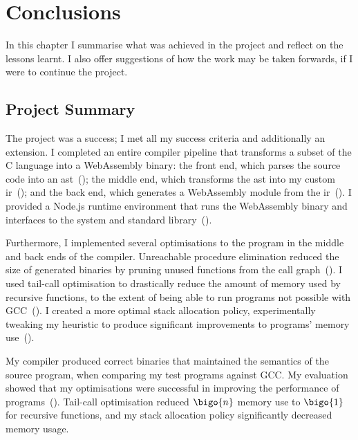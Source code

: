 \documentclass[00-main.tex]{subfiles}
\begin{document}
\chapter{Conclusions}

In this chapter I summarise what was achieved in the project and reflect on the lessons learnt.
I also offer suggestions of how the work may be taken forwards, if I were to continue the project.

\section{Project Summary}

The project was a success; I met all my success criteria and additionally an extension.
I completed an entire compiler pipeline that transforms a subset of the C language into a WebAssembly binary: the front end, which parses the source code into an \gls{ast}~(); the middle end, which transforms the \gls{ast} into my custom \gls{ir}~(); and the back end, which generates a WebAssembly module from the \gls{ir}~().
I provided a Node.js runtime environment that runs the WebAssembly binary and interfaces to the system and standard library~().

Furthermore, I implemented several optimisations to the program in the middle and back ends of the compiler.
Unreachable procedure elimination reduced the size of generated binaries by pruning unused functions from the call graph~().
I used tail-call optimisation to drastically reduce the amount of memory used by recursive functions, to the extent of being able to run programs not possible with GCC~().
I created a more optimal stack allocation policy, experimentally tweaking my heuristic to produce significant improvements to programs' memory use~().

My compiler produced correct binaries that maintained the semantics of the source program, when comparing my test programs against GCC\@.
My evaluation showed that my optimisations were successful in improving the performance of programs~().
Tail-call optimisation reduced $\bigo{n}$ memory use to $\bigo{1}$ for recursive functions, and my stack allocation policy significantly decreased memory usage.
\end{document}
